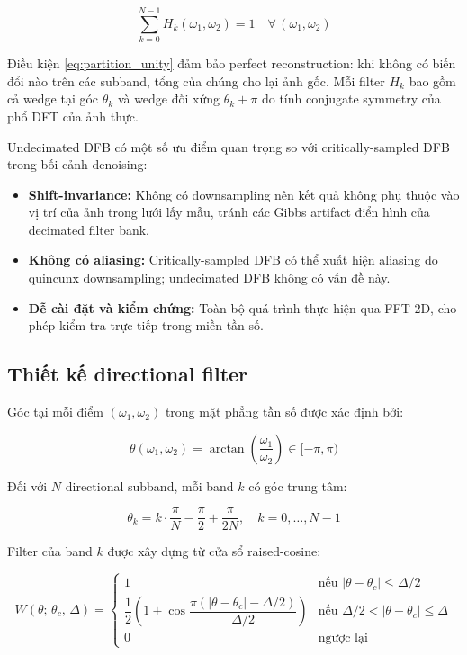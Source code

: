 \begin{equation}
    \sum_{k=0}^{N-1} H_k(\omega_1, \omega_2) = 1
    \quad \forall\, (\omega_1, \omega_2)
    \label{eq:partition_unity}
\end{equation}

Điều kiện \eqref{eq:partition_unity} đảm bảo perfect reconstruction: khi không có biến đổi nào trên các subband, tổng của chúng cho lại ảnh gốc. Mỗi filter $H_k$ bao gồm cả wedge tại góc $\theta_k$ và wedge đối xứng $\theta_k + \pi$ do tính conjugate symmetry của phổ DFT của ảnh thực.

Undecimated DFB có một số ưu điểm quan trọng so với critically-sampled DFB trong bối cảnh denoising:
\begin{itemize}
    \item \textbf{Shift-invariance:} Không có downsampling nên kết quả không phụ thuộc vào vị trí của ảnh trong lưới lấy mẫu, tránh các Gibbs artifact điển hình của decimated filter bank.
    \item \textbf{Không có aliasing:} Critically-sampled DFB có thể xuất hiện aliasing do quincunx downsampling; undecimated DFB không có vấn đề này.
    \item \textbf{Dễ cài đặt và kiểm chứng:} Toàn bộ quá trình thực hiện qua FFT 2D, cho phép kiểm tra trực tiếp trong miền tần số.
\end{itemize}

\subsection{Thiết kế directional filter}

Góc tại mỗi điểm $(\omega_1, \omega_2)$ trong mặt phẳng tần số được xác định bởi:

\begin{equation}
    \theta(\omega_1, \omega_2) = \arctan\!\left(\frac{\omega_1}{\omega_2}\right) \in [-\pi, \pi)
\end{equation}

Đối với $N$ directional subband, mỗi band $k$ có góc trung tâm:

\begin{equation}
    \theta_k = k \cdot \frac{\pi}{N} - \frac{\pi}{2} + \frac{\pi}{2N}, \quad k = 0, \ldots, N-1
\end{equation}

Filter của band $k$ được xây dựng từ cửa sổ raised-cosine:

\begin{equation}
    W(\theta;\, \theta_c,\, \Delta) =
    \begin{cases}
        1 & \text{nếu } |\theta - \theta_c| \leq \Delta/2 \\[4pt]
        \dfrac{1}{2}\!\left(1 + \cos\!\dfrac{\pi(|\theta - \theta_c| - \Delta/2)}{\Delta/2}\right)
          & \text{nếu } \Delta/2 < |\theta - \theta_c| \leq \Delta \\[4pt]
        0 & \text{ngược lại}
    \end{cases}
\end{equation}

